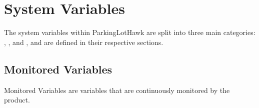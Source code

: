 \documentclass[12pt, titlepage]{article}
\begin{document}
\clearpage

\section{System Variables}

The system variables within ParkingLotHawk are split into three main categories: 
, , and , and are defined in their respective sections.

\subsection{Monitored Variables}
\label{subsec:Monitored Variables}

Monitored Variables are variables that are continuously monitored by the product.
\end{document}

